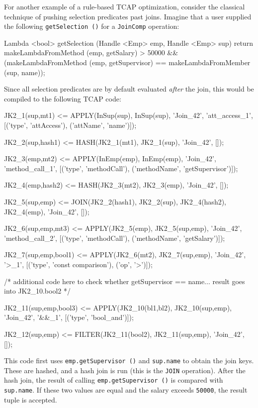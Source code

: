 \noindent
For another example of a rule-based TCAP optimization, 
consider the classical technique of pushing selection predicates past joins.  Imagine that a user supplied the following
\texttt{getSelection ()} for a \texttt{JoinComp} operation:

\begin{codesmall} 
Lambda <bool> getSelection (Handle <Emp> emp, Handle <Emp> sup) {
        return makeLambdaFromMethod (emp, getSalary) > 50000 &&
		(makeLambdaFromMethod (emp, getSupervisor) == 
                 makeLambdaFromMember (sup, name));
}	
\end{codesmall}

\noindent
Since all selection predicates are by default evaluated \emph{after} the join, 
this would be compiled to the following TCAP code:

\begin{codesmall}
JK2_1(sup,mt1) <= APPLY(InSup(sup), InSup(sup), 'Join_42', 'att_access_1', 
  [('type', 'attAccess'), ('attName', 'name')]);

JK2_2(sup,hash1) <= HASH(JK2_1(mt1), JK2_1(sup), 'Join_42', []);

JK2_3(emp,mt2) <= APPLY(InEmp(emp), InEmp(emp), 'Join_42', 'method_call_1', 
  [('type', 'methodCall'), ('methodName', 'getSupervisor')]);

JK2_4(emp,hash2) <= HASH(JK2_3(mt2), JK2_3(emp), 'Join_42', []);

JK2_5(sup,emp) <= JOIN(JK2_2(hash1), JK2_2(sup), 
  JK2_4(hash2), JK2_4(emp), 'Join_42', []);

JK2_6(sup,emp,mt3) <= APPLY(JK2_5(emp), JK2_5(sup,emp), 'Join_42', 'method_call_2',
  [('type', 'methodCall'), ('methodName', 'getSalary')]);

JK2_7(sup,emp,bool1) <= APPLY(JK2_6(mt2), JK2_7(sup,emp), 'Join_42', '>_1', 
  [('type', 'const comparison'), ('op', '>')]);

/* additional code here to check whether getSupervisor == name... 
   result goes into JK2_10.bool2 */

JK2_11(sup,emp,bool3) <= APPLY(JK2_10(bl1,bl2), JK2_10(sup,emp), 'Join_42', '&&_1', 
   [('type', 'bool_and')]);

JK2_12(sup,emp) <= FILTER(JK2_11(bool2), JK2_11(sup,emp), 'Join_42', []);
\end{codesmall}
 
\noindent
This code first uses \texttt{emp.getSupervisor ()} and \texttt{sup.name} to obtain the join keys. These are hashed, and 
a hash join is run (this is the \texttt{JOIN} operation).  After the hash join,
the result of calling \texttt{emp.getSupervisor ()} is compared with
\texttt{sup.name}.  If these two values are equal and the salary exceeds \texttt{50000}, the result tuple is accepted.

